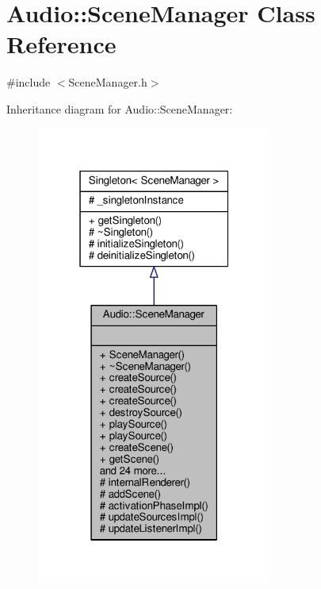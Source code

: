 \hypertarget{classAudio_1_1SceneManager}{}\section{Audio\+:\+:Scene\+Manager Class Reference}
\label{classAudio_1_1SceneManager}


{\ttfamily \#include $<$Scene\+Manager.\+h$>$}



Inheritance diagram for Audio\+:\+:Scene\+Manager\+:
\nopagebreak
\begin{figure}[H]
\begin{center}
\leavevmode
\includegraphics[width=220pt]{df/dd2/classAudio_1_1SceneManager__inherit__graph}
\end{center}
\end{figure}


